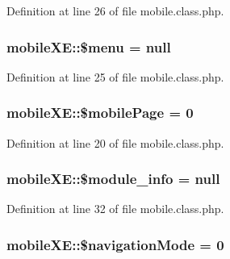 Definition at line 26 of file mobile.\+class.\+php.

\hypertarget{classmobileXE_a0ebb4296d28c9cb49fabb4d1252c1434}{
\subsubsection[{\$menu}]{\setlength{\rightskip}{0pt plus 5cm}mobile\+X\+E\+::\$menu = null}}\label{classmobileXE_a0ebb4296d28c9cb49fabb4d1252c1434}


Definition at line 25 of file mobile.\+class.\+php.

\hypertarget{classmobileXE_a4017307825d19d450c677b25b70eab5e}{
\subsubsection[{\$mobile\+Page}]{\setlength{\rightskip}{0pt plus 5cm}mobile\+X\+E\+::\$mobile\+Page = 0}}\label{classmobileXE_a4017307825d19d450c677b25b70eab5e}


Definition at line 20 of file mobile.\+class.\+php.

\hypertarget{classmobileXE_a926916a0195e056ccfdaf284e56b0ea6}{
\subsubsection[{\$module\+\_\+info}]{\setlength{\rightskip}{0pt plus 5cm}mobile\+X\+E\+::\$module\+\_\+info = null}}\label{classmobileXE_a926916a0195e056ccfdaf284e56b0ea6}


Definition at line 32 of file mobile.\+class.\+php.

\hypertarget{classmobileXE_aa6e85b2d6fe4667d7d0a3a2b3f13bd12}{
\subsubsection[{\$navigation\+Mode}]{\setlength{\rightskip}{0pt plus 5cm}mobile\+X\+E\+::\$navigation\+Mode = 0}}\label{classmobileXE_aa6e85b2d6fe4667d7d0a3a2b3f13bd12}


